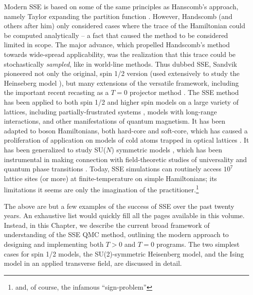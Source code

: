 \documentclass[vecphys]{svmult}
\begin{document}
Modern SSE is based on some of the same principles as Hanscomb's approach, namely Taylor expanding the partition function \cite{Melko:Handscomb62}.  However, Handscomb (and others after him) only considered cases where the trace of the Hamiltonian could be computed analytically --  a fact that caused the method to be considered limited in scope.
The major advance, which propelled Handscomb's method towards wide-spread applicability, was the realization that this trace could be stochastically {\em sampled}, like in world-line methods.
Thus dubbed SSE, Sandvik \cite{Melko:Sandvik91,Melko:Sandvik92} pioneered not only the original, spin 1/2 version (used extensively to study the Heinseberg model \cite{Melko:SandvikHeis}), but many extensions of the versatile framework, including the important recent recasting as a $T=0$ projector method \cite{Melko:Sandvik05,Melko:Beach06}.  The SSE method has been applied to both spin 1/2 and higher spin models \cite{Melko:Sandvik91,Melko:Henel} on a large variety of lattices, including partially-frustrated systems \cite{Melko:Melko07}, models with long-range interactions\cite{Melko:Sandvik03}, and other manifestations of quantum magnetism.  It has been adapted to boson Hamiltonians, both hard-core and soft-core, which has caused a proliferation of application on models of cold atoms trapped in optical lattices \cite{Melko:Wessel04}.  It has been generalized to study SU($N$) symmetric models \cite{Melko:harada2003:sun,Melko:Kawashima07}, which has been instrumental in making connection with field-theoretic studies of universality and quantum phase transitions \cite{Melko:kaul2011:j1j2,Melko:Designer}.  Today, SSE simulations can routinely access $10^7$ lattice sites (or more) at finite-temperature on simple Hamiltonians;  its limitations it seems are only the imagination of the practitioner.\footnote{and, of course, the infamous ``sign-problem''}

The above are but a few examples of the success of SSE over the past twenty years.  An exhaustive list would quickly fill all the pages available in this volume.  Instead, in this Chapter, we describe the current broad framework of understanding of the SSE QMC method, outlining the modern approach to designing and implementing both $T>0$ and $T=0$ programs.  The two simplest cases for spin 1/2 models, the SU(2)-symmetric Heisenberg model, and the Ising model in an applied transverse field, are discussed in detail.  
\end{document}
